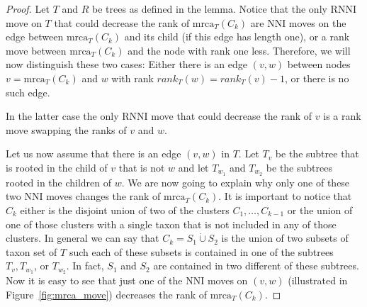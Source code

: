 \documentclass{amsart}
\newcommand{\mrca}{\mathrm{mrca}}
\newcommand{\nni}{\mathrm{NNI}}
\newcommand{\rnni}{\mathrm{RNNI}}
\begin{document}
\begin{proof}
Let $T$ and $R$ be trees as defined in the lemma.
Notice that the only $\rnni$ move on $T$ that could decrease the rank of $\mrca_T(C_k)$ are $\nni$ moves on the edge between $\mrca_T(C_k)$ and its child (if this edge has length one), or a rank move between $\mrca_T(C_k)$ and the node with rank one less.
Therefore, we will now distinguish these two cases:
Either there is an edge $(v,w)$ between nodes $v = \mrca_T(C_k)$ and $w$ with rank $rank_T(w) = rank_T(v) - 1$, or there is no such edge.

In the latter case the only $\rnni$ move that could decrease the rank of $v$ is a rank move swapping the ranks of $v$ and $w$.

Let us now assume that there is an edge $(v,w)$ in $T$.
Let $T_v$ be the subtree that is rooted in the child of $v$ that is not $w$ and let $T_{w_1}$ and $T_{w_2}$ be the subtrees rooted in the children of $w$.
We are now going to explain why only one of these two $\nni$ moves changes the rank of $\mrca_T(C_k)$.
It is important to notice that $C_k$ either is the disjoint union of two of the clusters $C_1, \ldots, C_{k-1}$ or the union of one of those clusters with a single taxon that is not included in any of those clusters.
In general we can say that $C_k = S_1 \dot\cup S_2$ is the union of two subsets of taxon set of $T$ such each of these subsets is contained in one of the subtrees $T_v, T_{w_1}$, or $T_{w_2}$.
In fact, $S_1$ and $S_2$ are contained in two different of these subtrees.
Now it is easy to see that just one of the $\nni$ moves on $(v,w)$ (illustrated in Figure~\ref{fig:mrca_move}) decreases the rank of $\mrca_T(C_k)$.


\end{proof}
\end{document}
